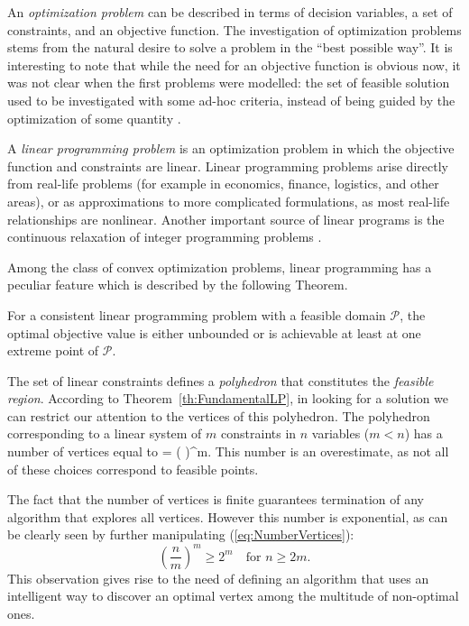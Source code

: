An {\em optimization problem} can be described in terms of decision variables, 
a set of constraints, and an objective function. 
The investigation of optimization problems stems from the natural
desire to solve a problem in the ``best possible way''.
It is interesting to note that while the need for an objective function 
is obvious now, it was not clear when the first problems were modelled: the 
set of feasible solution used to be investigated with some ad-hoc criteria, 
instead of being guided by the optimization of some quantity 
\cite{Dantzig02}.

A {\em linear programming problem} is an optimization problem in which
the objective function and constraints are linear. 
Linear programming problems arise directly from real-life problems
(for example in economics, finance, logistics,
and other areas), or as approximations to
more complicated formulations, as most real-life relationships are
nonlinear. Another important source of linear programs is the 
continuous relaxation of integer programming problems \cite{Schrijver86}.

Among the class of convex optimization problems, linear programming
has a peculiar feature which is described by the following Theorem.

\begin{theorem}
\label{th:FundamentalLP}
For a consistent linear programming problem with a
feasible domain $\mathcal{P}$, the optimal objective value is either
unbounded or is achievable at least at one extreme point of $\mathcal{P}$.
\end{theorem}

The set of linear constraints defines a {\em polyhedron} that constitutes
the {\em feasible region}.
According to Theorem~\ref{th:FundamentalLP}, in looking for a solution 
we can restrict our attention to the vertices of this polyhedron.
The polyhedron corresponding to a linear system of $m$ constraints 
in $n$ variables ($m < n$) has a number of vertices equal to
\be \label{eq:NumberVertices}
 =  \ge \left(  \right)^m.
\ee
This number is an overestimate, as not all of these choices correspond
to feasible points.

The fact that the number of vertices is finite guarantees termination 
of any algorithm that explores all vertices.
However this number is exponential, as can be clearly seen by further
manipulating (\ref{eq:NumberVertices}):
\[
\left( \frac{n}{m} \right)^m \ge 2^m 
\quad \mbox{for } n \ge 2m.
\]
This observation gives rise to the need of defining an algorithm
that uses an intelligent way to discover an optimal vertex 
among the multitude of non-optimal ones.

